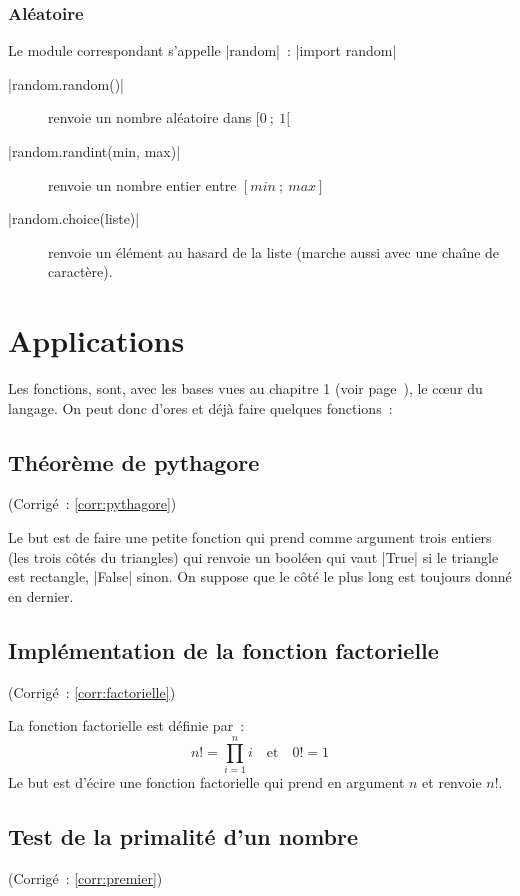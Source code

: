 		\subsubsection{Aléatoire}
		Le module correspondant s'appelle \python|random|~: \python|import random|
		\begin{description}
			\item[\python|random.random()|] renvoie un nombre aléatoire dans $[0~;\ 1[$
			\item[\python|random.randint(min, max)|] renvoie un nombre entier entre $[min~;\ max]$
			\item[\python|random.choice(liste)|] renvoie un élément au hasard de la liste (marche aussi avec une chaîne de caractère).
		\end{description}

\section{Applications}

		Les fonctions, sont, avec les bases vues au chapitre 1 (voir page~\pageref{chap_1}), le cœur du langage. On peut donc d'ores et déjà faire quelques fonctions~:
		
	\subsection{Théorème de pythagore} \label{appl:pythagore} (Corrigé~: \ref{corr:pythagore})
		
		Le but est de faire une petite fonction qui prend comme argument trois entiers (les trois côtés du triangles) qui renvoie un booléen qui vaut \python|True| si le triangle est rectangle, \python|False| sinon.
		On suppose que le côté le plus long est toujours donné en dernier.
		
	\subsection{Implémentation de la fonction factorielle} \label{appl:factorielle} (Corrigé~: \ref{corr:factorielle})
		
		La fonction factorielle est définie par~:
		\[
			n! = \prod_{i = 1}^n i \quad \textrm{et} \quad 0! = 1
		\]
		Le but est d'écire une fonction factorielle qui prend en argument $n$ et renvoie $n!$.
	
	\subsection{Test de la primalité d'un nombre} \label{appl:premier} (Corrigé~: \ref{corr:premier})

